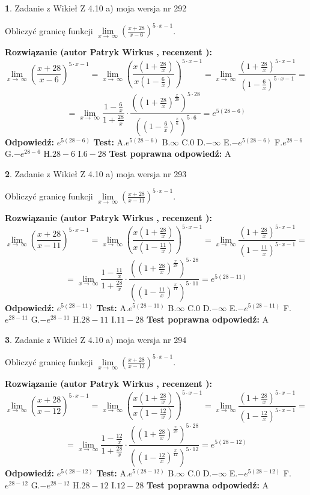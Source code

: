 \documentclass[12pt, a4paper]{article}
\theoremstyle{definition} %
\newtheorem{zad}{}
\newcommand{\zadStart}[1]{\begin{zad}#1\newline}
\newcommand{\zadStop}{\end{zad}}
\newcommand{\rozwStart}[2]{\noindent \textbf{Rozwiązanie (autor #1 , recenzent #2): }\newline}
\newcommand{\rozwStop}{\newline}
\newcommand{\odpStart}{\noindent \textbf{Odpowiedź:}\newline}
\newcommand{\odpStop}{\newline}
\newcommand{\testStart}{\noindent \textbf{Test:}\newline}
\newcommand{\testStop}{\newline}
\newcommand{\kluczStart}{\noindent \textbf{Test poprawna odpowiedź:}\newline}
\newcommand{\kluczStop}{\newline}
\begin{document}
\zadStart{Zadanie z Wikieł Z 4.10 a) moja wersja nr 292}


Obliczyć granicę funkcji  $\lim\limits_{x\to\ \infty}(\frac{x+28}{x-6})^{5\cdot x-1}$.
\zadStop
\rozwStart{Patryk Wirkus}{}
$$\lim\limits_{x\to\ \infty}(\frac{x+28}{x-6})^{5\cdot x-1} = \lim\limits_{x\to\ \infty}(\frac{x(1+\frac{28}{x})}{x(1-\frac{6}{x})})^{5\cdot x-1}=\lim\limits_{x\to\ \infty}\frac{(1+\frac{28}{x})^{5\cdot x-1}}{(1-\frac{6}{x})^{5\cdot x-1}}=$$
$$=\lim\limits_{x\to\ \infty}\frac{1-\frac{6}{x}}{1+\frac{28}{x}}\cdot\frac{((1+\frac{28}{x})^{\frac{x}{28}})^{5\cdot28}}{((1-\frac{6}{x})^{\frac{x}{6}})^{5\cdot6}}=e^{5(28-6)}$$
\rozwStop
\odpStart
$e^{5(28-6)}$
\odpStop
\testStart
A.$e^{5(28-6)}$ B.$\infty$ C.$0$ D.$-\infty$ E.$-e^{5(28-6)}$
F.$e^{28-6}$ G.$-e^{28-6}$
H.$28-6$
I.$6-28$
\testStop
\kluczStart
A
\kluczStop



\zadStart{Zadanie z Wikieł Z 4.10 a) moja wersja nr 293}


Obliczyć granicę funkcji  $\lim\limits_{x\to\ \infty}(\frac{x+28}{x-11})^{5\cdot x-1}$.
\zadStop
\rozwStart{Patryk Wirkus}{}
$$\lim\limits_{x\to\ \infty}(\frac{x+28}{x-11})^{5\cdot x-1} = \lim\limits_{x\to\ \infty}(\frac{x(1+\frac{28}{x})}{x(1-\frac{11}{x})})^{5\cdot x-1}=\lim\limits_{x\to\ \infty}\frac{(1+\frac{28}{x})^{5\cdot x-1}}{(1-\frac{11}{x})^{5\cdot x-1}}=$$
$$=\lim\limits_{x\to\ \infty}\frac{1-\frac{11}{x}}{1+\frac{28}{x}}\cdot\frac{((1+\frac{28}{x})^{\frac{x}{28}})^{5\cdot28}}{((1-\frac{11}{x})^{\frac{x}{11}})^{5\cdot11}}=e^{5(28-11)}$$
\rozwStop
\odpStart
$e^{5(28-11)}$
\odpStop
\testStart
A.$e^{5(28-11)}$ B.$\infty$ C.$0$ D.$-\infty$ E.$-e^{5(28-11)}$
F.$e^{28-11}$ G.$-e^{28-11}$
H.$28-11$
I.$11-28$
\testStop
\kluczStart
A
\kluczStop



\zadStart{Zadanie z Wikieł Z 4.10 a) moja wersja nr 294}


Obliczyć granicę funkcji  $\lim\limits_{x\to\ \infty}(\frac{x+28}{x-12})^{5\cdot x-1}$.
\zadStop
\rozwStart{Patryk Wirkus}{}
$$\lim\limits_{x\to\ \infty}(\frac{x+28}{x-12})^{5\cdot x-1} = \lim\limits_{x\to\ \infty}(\frac{x(1+\frac{28}{x})}{x(1-\frac{12}{x})})^{5\cdot x-1}=\lim\limits_{x\to\ \infty}\frac{(1+\frac{28}{x})^{5\cdot x-1}}{(1-\frac{12}{x})^{5\cdot x-1}}=$$
$$=\lim\limits_{x\to\ \infty}\frac{1-\frac{12}{x}}{1+\frac{28}{x}}\cdot\frac{((1+\frac{28}{x})^{\frac{x}{28}})^{5\cdot28}}{((1-\frac{12}{x})^{\frac{x}{12}})^{5\cdot12}}=e^{5(28-12)}$$
\rozwStop
\odpStart
$e^{5(28-12)}$
\odpStop
\testStart
A.$e^{5(28-12)}$ B.$\infty$ C.$0$ D.$-\infty$ E.$-e^{5(28-12)}$
F.$e^{28-12}$ G.$-e^{28-12}$
H.$28-12$
I.$12-28$
\testStop
\kluczStart
A
\kluczStop
\end{document}
